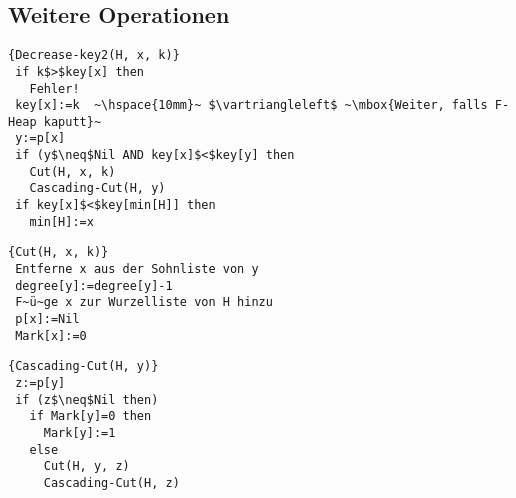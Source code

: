 \documentclass[ngerman,draft,parskip=half*,twoside]{scrreprt}
\theoremstyle{break}
\theoremstyle{nonumberbreak}
\begin{document}
\subsection{Weitere Operationen}
\begin{Algorithmus}[H]
\begin{lstlisting}[frame=tlrb, mathescape=true, title=\textsc{Decrease-Key\textnormal{(H, x, k)}}, gobble=1]{Decrease-key2(H, x, k)}
 if k$>$key[x] then
   Fehler!
 key[x]:=k  ~\hspace{10mm}~ $\vartriangleleft$ ~\mbox{Weiter, falls F-Heap kaputt}~ 
 y:=p[x]
 if (y$\neq$Nil AND key[x]$<$key[y] then
   Cut(H, x, k)
   Cascading-Cut(H, y)
 if key[x]$<$key[min[H]] then
   min[H]:=x  
\end{lstlisting}
\end{Algorithmus}

\begin{Algorithmus}[H]
\begin{lstlisting}[frame=tlrb, mathescape=true, title=\textsc{Cut\textnormal{(H, x, k)}}, gobble=1]{Cut(H, x, k)}
 Entferne x aus der Sohnliste von y
 degree[y]:=degree[y]-1
 F~ü~ge x zur Wurzelliste von H hinzu
 p[x]:=Nil
 Mark[x]:=0 
\end{lstlisting}
\end{Algorithmus}

\begin{Algorithmus}[H]
\begin{lstlisting}[frame=tlrb, mathescape=true, title=\textsc{Cascading-Cut\textnormal{(H, y)}}, gobble=1]{Cascading-Cut(H, y)}
 z:=p[y]
 if (z$\neq$Nil then)
   if Mark[y]=0 then
     Mark[y]:=1
   else
     Cut(H, y, z)
     Cascading-Cut(H, z)  
\end{lstlisting}
\end{Algorithmus}
\end{document}
